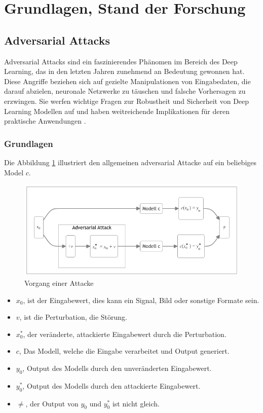 \section{Grundlagen, Stand der Forschung} 
\subsection{Adversarial Attacks}

Adversarial Attacks sind ein faszinierendes Phänomen im Bereich des Deep Learning, das in den letzten Jahren zunehmend an Bedeutung gewonnen hat. Diese Angriffe beziehen sich auf gezielte Manipulationen von Eingabedaten, die darauf abzielen, neuronale Netzwerke zu täuschen und falsche Vorhersagen zu erzwingen. Sie werfen wichtige Fragen zur Robustheit und Sicherheit von Deep Learning Modellen auf und haben weitreichende Implikationen für deren praktische Anwendungen \cite{goodfellow_explaining_2015}. 

\subsubsection{Grundlagen} 

Die Abbildung \ref{fig:grundlagen} illustriert den allgemeinen adversarial Attacke auf ein beliebiges Model $c$. 

\begin{figure}[H]
    \centering
    \includegraphics[width=13.5cm]{01-images/02-grundlagen/adversarial-attack.png}
    \caption{Vorgang einer Attacke}
    \label{fig:grundlagen}
\end{figure}

\begin{itemize}
    \item $x_0$, ist der Eingabewert, dies kann ein Signal, Bild oder sonstige Formate sein.
    \item $v$, ist die Perturbation, die Störung.
    \item $x_0^{*}$, der veränderte, attackierte Eingabewert durch die Perturbation.
    \item $c$, Das Modell, welche die Eingabe verarbeitet und Output generiert.
    \item $y_0$, Output des Modells durch den unveränderten Eingabewert.
    \item $y_0^{*}$, Output des Modells durch den attackierte Eingabewert.
    \item $\neq$, der Output von $y_0$ und $y_0^{*}$ ist nicht gleich.
\end{itemize}



